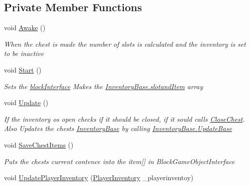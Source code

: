 \subsection*{Private Member Functions}
\begin{DoxyCompactItemize}
\item 
void \hyperlink{class_bee_game_1_1_inventory_1_1_chest_inventory_aa1ba251e8466684dc8a16b53afadbf90}{Awake} ()
\begin{DoxyCompactList}\small\item\em When the chest is made the number of slots is calculated and the inventory is set to be inactive \end{DoxyCompactList}\item 
void \hyperlink{class_bee_game_1_1_inventory_1_1_chest_inventory_a3476b739dab6ac46a8152da085d8399a}{Start} ()
\begin{DoxyCompactList}\small\item\em Sets the \hyperlink{class_bee_game_1_1_inventory_1_1_chest_inventory_aa18498b9af704585d4c747ff5a7444f8}{block\+Interface} Makes the \hyperlink{class_bee_game_1_1_inventory_1_1_inventory_base_a405502a6eabf14e1498d96dc8aff5e8d}{Inventory\+Base.\+slotand\+Item} array \end{DoxyCompactList}\item 
void \hyperlink{class_bee_game_1_1_inventory_1_1_chest_inventory_ad2b02fa5934d7447cd236180435a4d0f}{Update} ()
\begin{DoxyCompactList}\small\item\em If the inventory os open checks if it should be closed, if it sould calls \hyperlink{class_bee_game_1_1_inventory_1_1_chest_inventory_a0a42c60f89a1c79ce2be4f23da86e7b6}{Close\+Chest}. Also Updates the chests \hyperlink{class_bee_game_1_1_inventory_1_1_inventory_base}{Inventory\+Base} by calling \hyperlink{class_bee_game_1_1_inventory_1_1_inventory_base_aa1a965cf7ba9e04b22a4ef85ad133854}{Inventory\+Base.\+Update\+Base} \end{DoxyCompactList}\item 
void \hyperlink{class_bee_game_1_1_inventory_1_1_chest_inventory_a3e9326154a7f2602ba03bd6b21aba93f}{Save\+Chest\+Items} ()
\begin{DoxyCompactList}\small\item\em Puts the chests current contence into the item\mbox{[}\mbox{]} in Block\+Game\+Object\+Interface \end{DoxyCompactList}\item 
void \hyperlink{class_bee_game_1_1_inventory_1_1_chest_inventory_a426c17adf8e95a36e24f9793f6c90b48}{Update\+Player\+Inventory} (\hyperlink{class_bee_game_1_1_inventory_1_1_player_inventory}{Player\+Inventory} \+\_\+playerinventoy)

\end{DoxyCompactItemize}
